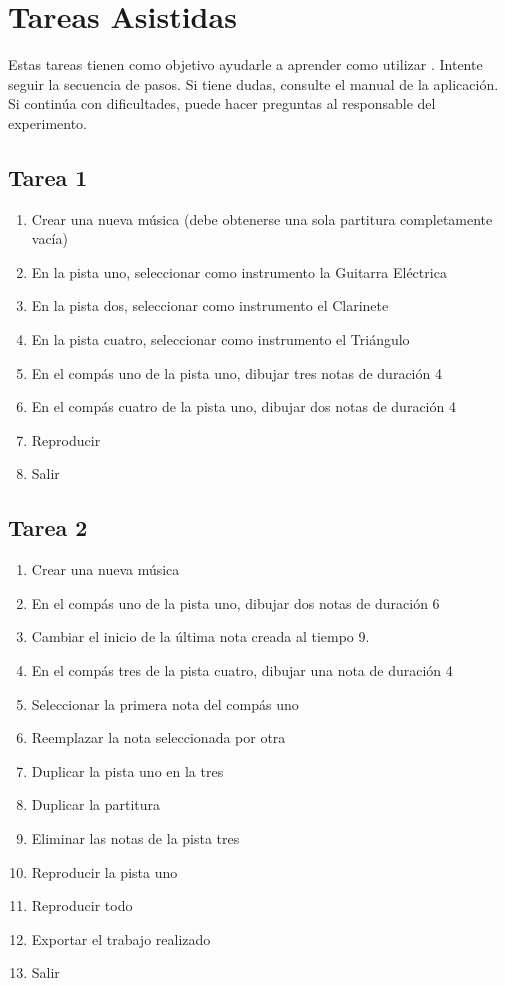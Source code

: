 \section{Tareas Asistidas}

Estas tareas tienen como objetivo ayudarle a aprender como utilizar .
Intente seguir la secuencia de pasos. Si tiene dudas, consulte el manual de la aplicaci\'on.
Si contin\'ua con dificultades, puede hacer preguntas al responsable del experimento.

\subsection{Tarea 1}
\begin{enumerate}
    \item Crear una nueva m\'usica (debe obtenerse una sola partitura completamente vac\'ia)
    \item En la pista uno, seleccionar como instrumento la Guitarra El\'ectrica
    \item En la pista dos, seleccionar como instrumento el Clarinete
    \item En la pista cuatro, seleccionar como instrumento el Tri\'angulo
    \item En el comp\'as uno de la pista uno, dibujar tres notas de duraci\'on 4
    \item En el comp\'as cuatro de la pista uno, dibujar dos notas de duraci\'on 4
    \item Reproducir
    \item Salir
\end{enumerate}

\subsection{Tarea 2}
\begin{enumerate}
    \item Crear una nueva m\'usica
    \item En el comp\'as uno de la pista uno, dibujar dos notas de duraci\'on 6
    \item Cambiar el inicio de la \'ultima nota creada al tiempo 9.
    \item En el comp\'as tres de la pista cuatro, dibujar una nota de duraci\'on 4
    \item Seleccionar la primera nota del comp\'as uno
    \item Reemplazar la nota seleccionada por otra
    \item Duplicar la pista uno en la tres
    \item Duplicar la partitura
    \item Eliminar las notas de la pista tres
    \item Reproducir la pista uno
    \item Reproducir todo
    \item Exportar el trabajo realizado
    \item Salir
\end{enumerate}

